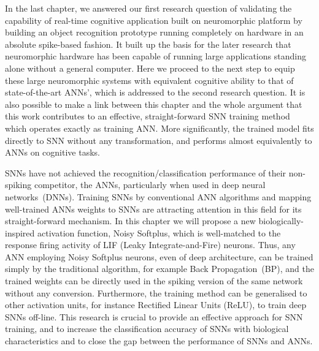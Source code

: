 \label{cha:Conv}

In the last chapter, we answered our first research question of validating the capability of real-time cognitive application built on neuromorphic platform by building an object recognition prototype running completely on hardware in an absolute spike-based fashion.
It built up the basis for the later research that neuromorphic hardware has been capable of running large applications standing alone without a general computer.
Here we proceed to the next step to equip these large neuromorphic systems with equivalent cognitive ability to that of state-of-the-art ANNs', which is addressed to the second research question.
It is also possible to make a link between this chapter and the whole argument that this work contributes to an effective, straight-forward SNN training method which operates exactly as training ANN.
More significantly, the trained model fits directly to SNN without any transformation, and performs almost equivalently to ANNs on cognitive tasks.

SNNs have not achieved the recognition/classification performance of their non-spiking competitor, the ANNs, particularly when used in deep neural networks~(DNNs).
Training SNNs by conventional ANN algorithms and mapping well-trained ANNs weights to SNNs are attracting attention in this field for its straight-forward mechanism.
In this chapter we will propose a new biologically-inspired activation function, Noisy Softplus, which is well-matched to the response firing activity of LIF (Leaky Integrate-and-Fire) neurons.
Thus, any ANN employing Noisy Softplus neurons, even of deep architecture, can be trained simply by the traditional algorithm, for example Back Propagation~(BP), and the trained weights can be directly used in the spiking version of the same network without any conversion.
Furthermore, the training method can be generalised to other activation units, for instance Rectified Linear Units (ReLU), to train deep SNNs off-line.
This research is crucial to provide an effective approach for SNN training, and to increase the classification accuracy of SNNs with biological characteristics and to close the gap between the performance of SNNs and ANNs.

